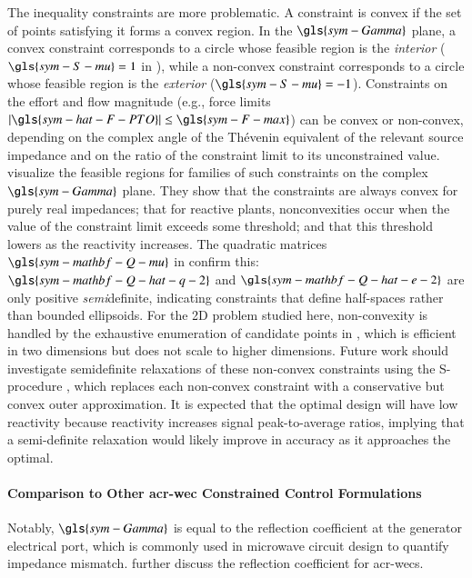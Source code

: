The inequality constraints are more problematic.
A constraint is convex if the set of points satisfying it forms a convex region.
In the $\gls{sym-Gamma}$ plane, a convex constraint corresponds to a circle whose feasible region is the \emph{interior} ($\gls{sym-S-mu}=1$ in ), while a non-convex constraint corresponds to a circle whose feasible region is the \emph{exterior} ($\gls{sym-S-mu}=-1$).
Constraints on the effort and flow magnitude (e.g., force limits $|\gls{sym-hat-F-PTO} |\leq \gls{sym-F-max}$) can be convex or non-convex, depending on the complex angle of the Th\'{e}venin equivalent of the relevant source impedance and on the ratio of the constraint limit to its unconstrained value.
\citet{mccabe_force-limited_2024} visualize the feasible regions for families of such constraints on the complex $\gls{sym-Gamma}$ plane.
They show that the constraints are always convex for purely real impedances; that for reactive plants, nonconvexities occur when the value of the constraint limit exceeds some threshold; and that this threshold lowers as the reactivity increases.
The quadratic matrices $\gls{sym-mathbf-Q-mu}$ in  confirm this: $\gls{sym-mathbf-Q-hat-q-2}$ and $\gls{sym-mathbf-Q-hat-e-2}$ are only positive \emph{semi}definite, indicating constraints that define half-spaces rather than bounded ellipsoids.
For the 2D problem studied here, non-convexity is handled by the exhaustive enumeration of candidate points in , which is efficient in two dimensions but does not scale to higher dimensions.
Future work should investigate semidefinite relaxations of these non-convex constraints using the S-procedure \citep{vanantwerp_tutorial_2000}, which replaces each non-convex constraint with a conservative but convex outer approximation.
It is expected that the optimal design will have low reactivity because reactivity increases signal peak-to-average ratios, implying that a semi-definite relaxation would likely improve in accuracy as it approaches the optimal.

\paragraph{Comparison to Other \gls{acr-wec} Constrained Control Formulations}
Notably, $\gls{sym-Gamma}$ is equal to the reflection coefficient at the generator electrical port, which is commonly used in microwave circuit design to quantify impedance mismatch.
\citet{mccabe_force-limited_2024,coe_co-design_2025} further discuss the reflection coefficient for \glspl{acr-wec}.

